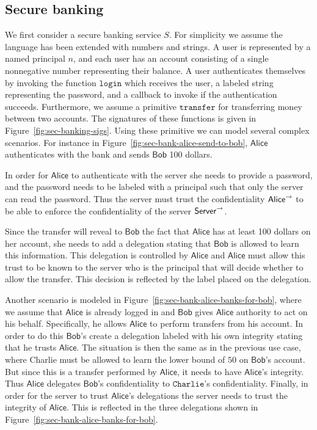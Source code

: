 \subsection{Secure banking}\label{subsec:banking}
We first consider a secure banking service $S$. For simplicity we assume the language has been extended with numbers and strings. A user is represented by a named principal $n$, and each user has an account consisting of a single nonnegative number representing their balance. A user authenticates themselves by invoking the function $\mathtt{login}$ which receives the user, a labeled string representing the password, and a callback to invoke if the authentication succeeds. Furthermore, we assume a primitive $\mathtt{transfer}$ for transferring money between two accounts. The signatures of these functions is given in Figure~\ref{fig:sec-banking-sigs}.
Using these primitive we can model several complex scenarios. For instance in Figure~\ref{fig:sec-bank-alice-send-to-bob}, $\mathsf{Alice}$ authenticates with the bank and sends $\mathsf{Bob}$ 100 dollars.

In order for $\mathsf{Alice}$ to authenticate with the server she needs to provide a password, and the password needs to be labeled with a principal such that only the server can read the password. Thus the server must trust the confidentiality $\mathsf{Alice}^{\rightarrow}$ to be able to enforce the confidentiality of the server $\mathsf{Server}^{\rightarrow}$. 

Since the transfer will reveal to $\mathsf{Bob}$ the fact that $\mathsf{Alice}$ has at least 100 dollars on her account, she needs to add a delegation stating that $\mathsf{Bob}$ is allowed to learn this information. This delegation is controlled by $\mathsf{Alice}$ and $\mathsf{Alice}$ must allow this trust to be known to the server who is the principal that will decide whether to allow the transfer. This decision is reflected by the label placed on the delegation.

Another scenario is modeled in Figure~\ref{fig:sec-bank-alice-banks-for-bob}, where we assume that $\mathsf{Alice}$ is already logged in and $\mathsf{Bob}$ gives $\mathsf{Alice}$ authority to act on his behalf. Specifically, he allows $\mathsf{Alice}$ to perform transfers from his account. In order to do this $\mathsf{Bob}$'s create a delegation labeled with his own integrity stating that he trusts $\mathsf{Alice}$. The situation is then the same as in the previous use case, where Charlie must be allowed to learn the lower bound of $50$ on $\mathsf{Bob}$'s account. But since this is a transfer performed by $\mathsf{Alice}$, it needs to have $\mathsf{Alice}$'s integrity. Thus $\mathsf{Alice}$ delegates $\mathsf{Bob}$'s confidentiality to $\mathtt{Charlie}$'s confidentiality. Finally, in order for the server to trust $\mathsf{Alice}$'s delegations the server needs to trust the integrity of $\mathsf{Alice}$. This is reflected in the three delegations shown in Figure~\ref{fig:sec-bank-alice-banks-for-bob}.

